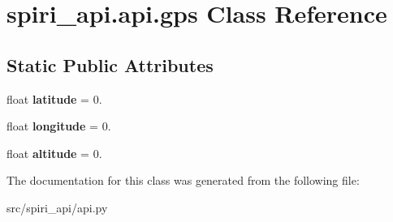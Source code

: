 \hypertarget{classspiri__api_1_1api_1_1gps}{\section{spiri\-\_\-api.\-api.\-gps \-Class \-Reference}
\label{classspiri__api_1_1api_1_1gps}
}
\subsection*{\-Static \-Public \-Attributes}
\begin{DoxyCompactItemize}
\item 
\hypertarget{classspiri__api_1_1api_1_1gps_ab535c637bad9c4108ef50f426ba168a4}{float {\bfseries latitude} = 0.}\label{classspiri__api_1_1api_1_1gps_ab535c637bad9c4108ef50f426ba168a4}

\item 
\hypertarget{classspiri__api_1_1api_1_1gps_a0eb2d504c58d058d929dd927521a5dad}{float {\bfseries longitude} = 0.}\label{classspiri__api_1_1api_1_1gps_a0eb2d504c58d058d929dd927521a5dad}

\item 
\hypertarget{classspiri__api_1_1api_1_1gps_ad6feb4389cb183b0aba1311605f84c1b}{float {\bfseries altitude} = 0.}\label{classspiri__api_1_1api_1_1gps_ad6feb4389cb183b0aba1311605f84c1b}

\end{DoxyCompactItemize}


\-The documentation for this class was generated from the following file\-:\begin{DoxyCompactItemize}
\item 
src/spiri\-\_\-api/api.\-py\end{DoxyCompactItemize}
